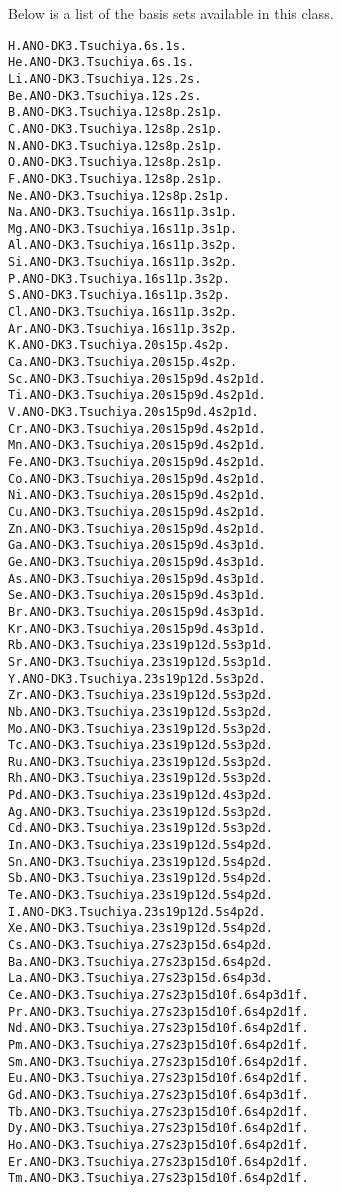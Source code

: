 Below is a list of the basis sets available in this class.
\begin{verbatim}
H.ANO-DK3.Tsuchiya.6s.1s.
He.ANO-DK3.Tsuchiya.6s.1s.
Li.ANO-DK3.Tsuchiya.12s.2s.
Be.ANO-DK3.Tsuchiya.12s.2s.
B.ANO-DK3.Tsuchiya.12s8p.2s1p.
C.ANO-DK3.Tsuchiya.12s8p.2s1p.
N.ANO-DK3.Tsuchiya.12s8p.2s1p.
O.ANO-DK3.Tsuchiya.12s8p.2s1p.
F.ANO-DK3.Tsuchiya.12s8p.2s1p.
Ne.ANO-DK3.Tsuchiya.12s8p.2s1p.
Na.ANO-DK3.Tsuchiya.16s11p.3s1p.
Mg.ANO-DK3.Tsuchiya.16s11p.3s1p.
Al.ANO-DK3.Tsuchiya.16s11p.3s2p.
Si.ANO-DK3.Tsuchiya.16s11p.3s2p.
P.ANO-DK3.Tsuchiya.16s11p.3s2p.
S.ANO-DK3.Tsuchiya.16s11p.3s2p.
Cl.ANO-DK3.Tsuchiya.16s11p.3s2p.
Ar.ANO-DK3.Tsuchiya.16s11p.3s2p.
K.ANO-DK3.Tsuchiya.20s15p.4s2p.
Ca.ANO-DK3.Tsuchiya.20s15p.4s2p.
Sc.ANO-DK3.Tsuchiya.20s15p9d.4s2p1d.
Ti.ANO-DK3.Tsuchiya.20s15p9d.4s2p1d.
V.ANO-DK3.Tsuchiya.20s15p9d.4s2p1d.
Cr.ANO-DK3.Tsuchiya.20s15p9d.4s2p1d.
Mn.ANO-DK3.Tsuchiya.20s15p9d.4s2p1d.
Fe.ANO-DK3.Tsuchiya.20s15p9d.4s2p1d.
Co.ANO-DK3.Tsuchiya.20s15p9d.4s2p1d.
Ni.ANO-DK3.Tsuchiya.20s15p9d.4s2p1d.
Cu.ANO-DK3.Tsuchiya.20s15p9d.4s2p1d.
Zn.ANO-DK3.Tsuchiya.20s15p9d.4s2p1d.
Ga.ANO-DK3.Tsuchiya.20s15p9d.4s3p1d.
Ge.ANO-DK3.Tsuchiya.20s15p9d.4s3p1d.
As.ANO-DK3.Tsuchiya.20s15p9d.4s3p1d.
Se.ANO-DK3.Tsuchiya.20s15p9d.4s3p1d.
Br.ANO-DK3.Tsuchiya.20s15p9d.4s3p1d.
Kr.ANO-DK3.Tsuchiya.20s15p9d.4s3p1d.
Rb.ANO-DK3.Tsuchiya.23s19p12d.5s3p1d.
Sr.ANO-DK3.Tsuchiya.23s19p12d.5s3p1d.
Y.ANO-DK3.Tsuchiya.23s19p12d.5s3p2d.
Zr.ANO-DK3.Tsuchiya.23s19p12d.5s3p2d.
Nb.ANO-DK3.Tsuchiya.23s19p12d.5s3p2d.
Mo.ANO-DK3.Tsuchiya.23s19p12d.5s3p2d.
Tc.ANO-DK3.Tsuchiya.23s19p12d.5s3p2d.
Ru.ANO-DK3.Tsuchiya.23s19p12d.5s3p2d.
Rh.ANO-DK3.Tsuchiya.23s19p12d.5s3p2d.
Pd.ANO-DK3.Tsuchiya.23s19p12d.4s3p2d.
Ag.ANO-DK3.Tsuchiya.23s19p12d.5s3p2d.
Cd.ANO-DK3.Tsuchiya.23s19p12d.5s3p2d.
In.ANO-DK3.Tsuchiya.23s19p12d.5s4p2d.
Sn.ANO-DK3.Tsuchiya.23s19p12d.5s4p2d.
Sb.ANO-DK3.Tsuchiya.23s19p12d.5s4p2d.
Te.ANO-DK3.Tsuchiya.23s19p12d.5s4p2d.
I.ANO-DK3.Tsuchiya.23s19p12d.5s4p2d.
Xe.ANO-DK3.Tsuchiya.23s19p12d.5s4p2d.
Cs.ANO-DK3.Tsuchiya.27s23p15d.6s4p2d.
Ba.ANO-DK3.Tsuchiya.27s23p15d.6s4p2d.
La.ANO-DK3.Tsuchiya.27s23p15d.6s4p3d.
Ce.ANO-DK3.Tsuchiya.27s23p15d10f.6s4p3d1f.
Pr.ANO-DK3.Tsuchiya.27s23p15d10f.6s4p2d1f.
Nd.ANO-DK3.Tsuchiya.27s23p15d10f.6s4p2d1f.
Pm.ANO-DK3.Tsuchiya.27s23p15d10f.6s4p2d1f.
Sm.ANO-DK3.Tsuchiya.27s23p15d10f.6s4p2d1f.
Eu.ANO-DK3.Tsuchiya.27s23p15d10f.6s4p2d1f.
Gd.ANO-DK3.Tsuchiya.27s23p15d10f.6s4p3d1f.
Tb.ANO-DK3.Tsuchiya.27s23p15d10f.6s4p2d1f.
Dy.ANO-DK3.Tsuchiya.27s23p15d10f.6s4p2d1f.
Ho.ANO-DK3.Tsuchiya.27s23p15d10f.6s4p2d1f.
Er.ANO-DK3.Tsuchiya.27s23p15d10f.6s4p2d1f.
Tm.ANO-DK3.Tsuchiya.27s23p15d10f.6s4p2d1f.

\end{verbatim}

